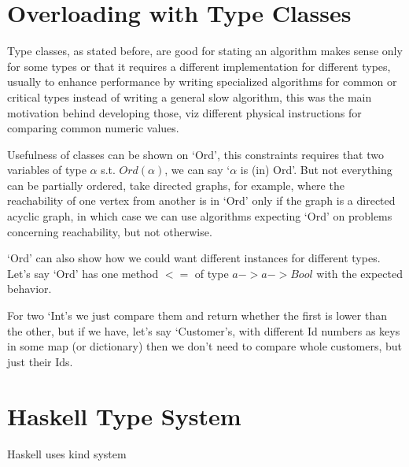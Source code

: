 \section{Overloading with Type Classes}

Type classes, as stated before, are good for stating an algorithm makes sense only for some types or that it requires a different implementation for different types, usually to enhance performance by writing specialized algorithms for common or critical types instead of writing a general slow algorithm, this was the main motivation behind developing those, %
viz different physical instructions for comparing common numeric values.

Usefulness of classes can be shown on `Ord', this constraints requires that two variables of type $\alpha$ s.t. $Ord(\alpha)$, we can say `$\alpha$ is (in) Ord'. But not everything can be partially ordered, take directed graphs, for example, where the reachability of one vertex from another is in `Ord' only if the graph is a directed acyclic graph, in which case we can use algorithms expecting `Ord' on problems concerning reachability, but not otherwise.

`Ord' can also show how we could want different instances for different types. Let's say `Ord' has one method $<=$ of type $a -> a -> Bool$ with the expected behavior. %

For two `Int's we just compare them and return whether the first is lower than the other, but if we have, let's say `Customer's, with different Id numbers as keys in some map (or dictionary) then we don't need to compare whole customers, but just their Ids.



\section{Haskell Type System}


Haskell uses kind system %

